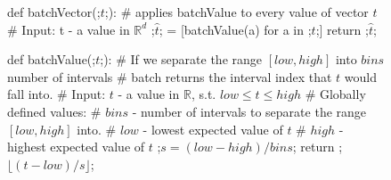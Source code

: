 \documentclass[dissertation.tex]{subfiles}
\begin{document}
\begin{figure}[H]
    \begin{pythonfigure}
      def batchVector(;$t$;): 
        # applies batchValue to every value of vector $t$
        # Input: t - a value in $\mathbb{R}^d$
        ;$\hat{t}$; = [batchValue(a) for a in ;$t$;]
        return ;$\hat{t}$;

      def batchValue(;$t$;):
        # If we separate the range $[low, high]$ into $bins$ number of intervals 
        # batch returns the interval index that $t$ would fall into.
        # Input: $t$ - a value in $\mathbb{R}$, s.t. $low\leq{t}\leq{high}$
        # Globally defined values:
        # $bins$  - number of intervals to separate the range $[low, high]$ into.
        # $low$   - lowest  expected value of $t$
        # $high$  - highest expected value of $t$
        ;$s = (low - high) / bins$;
        return ;$\lfloor{(t - low)/s}\rfloor$;
    \end{pythonfigure}
    \caption{
    }
    \label{figBatch}
\end{figure}

\newpage
\end{document}
